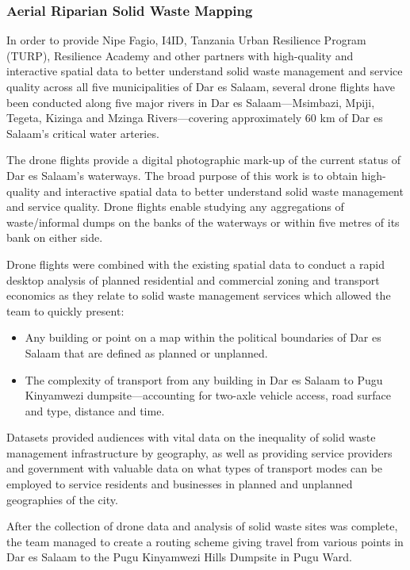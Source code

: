 \documentclass[a4paper,12pt,twoside]{article}
\begin{document}
\subsubsection{Aerial Riparian Solid Waste Mapping}
\begin{multicols}{2}
In order to provide Nipe Fagio, I4ID, Tanzania Urban Resilience Program (TURP), Resilience Academy and other partners with high-quality and interactive spatial data to better understand solid waste management and service quality across all five municipalities of Dar es Salaam, several drone flights have been conducted along five major rivers in Dar es Salaam—Msimbazi, Mpiji, Tegeta, Kizinga and Mzinga Rivers—covering approximately 60 km of Dar es Salaam’s critical water arteries.

The drone flights provide a digital photographic mark-up of the current status of Dar es Salaam’s waterways. The broad purpose of this work is to obtain high-quality and interactive spatial data to better understand solid waste management and service quality. Drone flights enable studying any aggregations of waste/informal dumps on the banks of the waterways or within five metres of its bank on either side.

Drone flights were combined with the existing spatial data to conduct a rapid desktop analysis of planned residential and commercial zoning and transport economics as they relate to solid waste management services which allowed the team to quickly present:
\begin{itemize}
    \item Any building or point on a map within the political boundaries of Dar es Salaam that are defined as planned or unplanned.
    \item The complexity of transport from any building in Dar es Salaam to Pugu Kinyamwezi dumpsite—accounting for two-axle vehicle access, road surface and type, distance and time.
\end{itemize}
Datasets provided audiences with vital data on the inequality of solid waste management infrastructure by geography, as well as providing service providers and government with valuable data on what types of transport modes can be employed to service residents and businesses in planned and unplanned geographies of the city.

After the collection of drone data and analysis of solid waste sites was complete, the team managed to create a routing scheme giving travel from various points in Dar es Salaam to the Pugu Kinyamwezi Hills Dumpsite in Pugu Ward.
\end{multicols}
\end{document}
